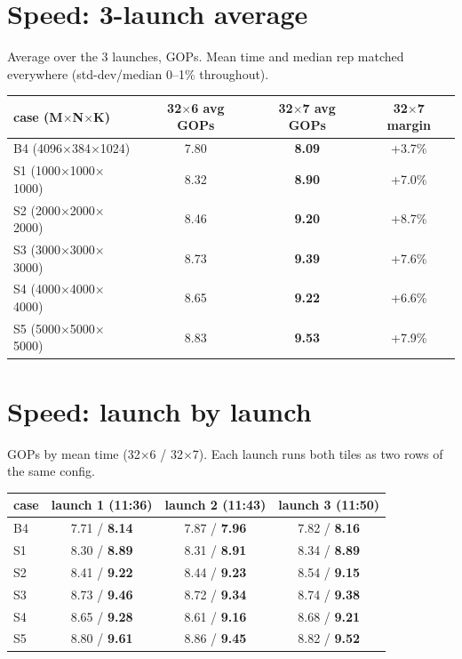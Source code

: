 \documentclass[10pt,a4paper]{article}
\newcommand{\up}[1]{\textcolor{red!70!black}{#1}}
\newcommand{\good}[1]{\textcolor{green!45!black}{\textbf{#1}}}
\begin{document}
\section{Speed: 3-launch average}
Average over the 3 launches, GOPs. Mean time and median rep matched everywhere (std-dev/median 0--1\% throughout).

\begin{center}\footnotesize\setlength{\tabcolsep}{6pt}
\begin{tabular}{@{}lccc@{}}
\toprule
case (M$\times$N$\times$K) & 32$\times$6 avg GOPs & 32$\times$7 avg GOPs & 32$\times$7 margin \\
\midrule
B4 (4096$\times$384$\times$1024) & 7.80 & \good{8.09} & \up{+3.7\%} \\
S1 (1000$\times$1000$\times$1000) & 8.32 & \good{8.90} & \up{+7.0\%} \\
S2 (2000$\times$2000$\times$2000) & 8.46 & \good{9.20} & \up{+8.7\%} \\
S3 (3000$\times$3000$\times$3000) & 8.73 & \good{9.39} & \up{+7.6\%} \\
S4 (4000$\times$4000$\times$4000) & 8.65 & \good{9.22} & \up{+6.6\%} \\
S5 (5000$\times$5000$\times$5000) & 8.83 & \good{9.53} & \up{+7.9\%} \\
\bottomrule
\end{tabular}
\end{center}

\section{Speed: launch by launch}
GOPs by mean time (32$\times$6 / 32$\times$7). Each launch runs both tiles as two rows of the same config.

\begin{center}\footnotesize\setlength{\tabcolsep}{5pt}
\begin{tabular}{@{}lccc@{}}
\toprule
case & launch 1 (11:36) & launch 2 (11:43) & launch 3 (11:50) \\
\midrule
B4 & 7.71 / \good{8.14} & 7.87 / \good{7.96} & 7.82 / \good{8.16} \\
S1 & 8.30 / \good{8.89} & 8.31 / \good{8.91} & 8.34 / \good{8.89} \\
S2 & 8.41 / \good{9.22} & 8.44 / \good{9.23} & 8.54 / \good{9.15} \\
S3 & 8.73 / \good{9.46} & 8.72 / \good{9.34} & 8.74 / \good{9.38} \\
S4 & 8.65 / \good{9.28} & 8.61 / \good{9.16} & 8.68 / \good{9.21} \\
S5 & 8.80 / \good{9.61} & 8.86 / \good{9.45} & 8.82 / \good{9.52} \\
\bottomrule
\end{tabular}
\end{center}
\end{document}
